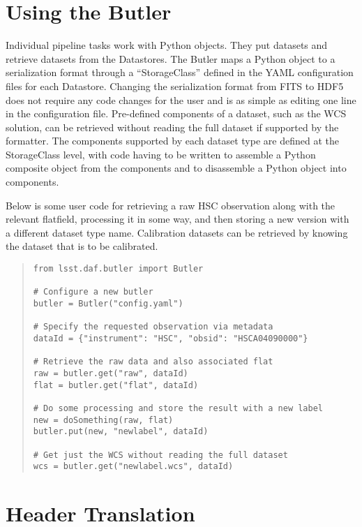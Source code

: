 \documentclass[11pt,twoside]{article}
\begin{document}
\section{Using the Butler}
\label{sec:using}

Individual pipeline tasks work with Python objects.
They put datasets and retrieve datasets from the Datastores.
The Butler maps a Python object  to  a serialization format through a ``StorageClass'' defined in the YAML configuration files for each Datastore.
Changing the serialization format from FITS to HDF5 does not require any code changes for the user and is as simple as editing one line in the configuration file.
Pre-defined components of a dataset, such as the WCS solution, can be retrieved without reading the full dataset if supported by the formatter.
The components supported by each dataset type are defined at the StorageClass level, with code having to be written to assemble a Python composite object from the components and to disassemble a Python object into components.

Below is some user code for retrieving a raw HSC observation along with the relevant flatfield, processing it in some way, and then storing a new version with a different dataset type name.
Calibration datasets can be retrieved by knowing the dataset that is to be calibrated.

\begin{quote}
\begin{small}
\begin{verbatim}
from lsst.daf.butler import Butler

# Configure a new butler
butler = Butler("config.yaml")

# Specify the requested observation via metadata
dataId = {"instrument": "HSC", "obsid": "HSCA04090000"}

# Retrieve the raw data and also associated flat
raw = butler.get("raw", dataId)
flat = butler.get("flat", dataId)

# Do some processing and store the result with a new label
new = doSomething(raw, flat)
butler.put(new, "newlabel", dataId)

# Get just the WCS without reading the full dataset
wcs = butler.get("newlabel.wcs", dataId)
\end{verbatim}
\end{small}
\end{quote}

\section{Header Translation}
\end{document}
